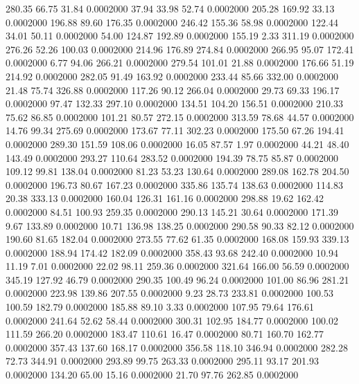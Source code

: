  280.35   66.75   31.84   0.0002000
  37.94   33.98   52.74   0.0002000
 205.28  169.92   33.13   0.0002000
 196.88   89.60  176.35   0.0002000
 246.42  155.36   58.98   0.0002000
 122.44   34.01   50.11   0.0002000
  54.00  124.87  192.89   0.0002000
 155.19    2.33  311.19   0.0002000
 276.26   52.26  100.03   0.0002000
 214.96  176.89  274.84   0.0002000
 266.95   95.07  172.41   0.0002000
   6.77   94.06  266.21   0.0002000
 279.54  101.01   21.88   0.0002000
 176.66   51.19  214.92   0.0002000
 282.05   91.49  163.92   0.0002000
 233.44   85.66  332.00   0.0002000
  21.48   75.74  326.88   0.0002000
 117.26   90.12  266.04   0.0002000
  29.73   69.33  196.17   0.0002000
  97.47  132.33  297.10   0.0002000
 134.51  104.20  156.51   0.0002000
 210.33   75.62   86.85   0.0002000
 101.21   80.57  272.15   0.0002000
 313.59   78.68   44.57   0.0002000
  14.76   99.34  275.69   0.0002000
 173.67   77.11  302.23   0.0002000
 175.50   67.26  194.41   0.0002000
 289.30  151.59  108.06   0.0002000
  16.05   87.57    1.97   0.0002000
  44.21   48.40  143.49   0.0002000
 293.27  110.64  283.52   0.0002000
 194.39   78.75   85.87   0.0002000
 109.12   99.81  138.04   0.0002000
  81.23   53.23  130.64   0.0002000
 289.08  162.78  204.50   0.0002000
 196.73   80.67  167.23   0.0002000
 335.86  135.74  138.63   0.0002000
 114.83   20.38  333.13   0.0002000
 160.04  126.31  161.16   0.0002000
 298.88   19.62  162.42   0.0002000
  84.51  100.93  259.35   0.0002000
 290.13  145.21   30.64   0.0002000
 171.39    9.67  133.89   0.0002000
  10.71  136.98  138.25   0.0002000
 290.58   90.33   82.12   0.0002000
 190.60   81.65  182.04   0.0002000
 273.55   77.62   61.35   0.0002000
 168.08  159.93  339.13   0.0002000
 188.94  174.42  182.09   0.0002000
 358.43   93.68  242.40   0.0002000
  10.94   11.19    7.01   0.0002000
  22.02   98.11  259.36   0.0002000
 321.64  166.00   56.59   0.0002000
 345.19  127.92   46.79   0.0002000
 290.35  100.49   96.24   0.0002000
 101.00   86.96  281.21   0.0002000
 223.98  139.86  207.55   0.0002000
   9.23   28.73  233.81   0.0002000
 100.53  100.59  182.79   0.0002000
 185.88   89.10    3.33   0.0002000
 107.95   79.64  176.61   0.0002000
 241.64   52.62   58.44   0.0002000
 300.31  102.95  184.77   0.0002000
 100.02  111.59  266.20   0.0002000
 183.47  110.61   16.47   0.0002000
  80.71  160.70  162.77   0.0002000
 357.43  137.60  168.17   0.0002000
 356.58  118.10  346.94   0.0002000
 282.28   72.73  344.91   0.0002000
 293.89   99.75  263.33   0.0002000
 295.11   93.17  201.93   0.0002000
 134.20   65.00   15.16   0.0002000
  21.70   97.76  262.85   0.0002000
